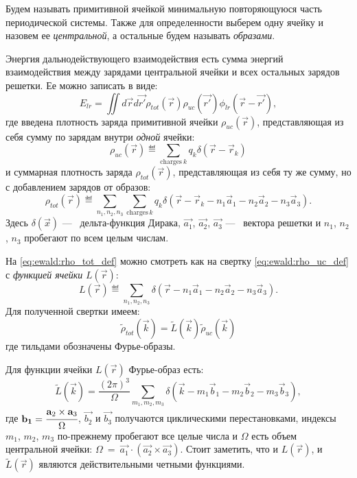 Будем называть примитивной ячейкой минимальную повторяющуюся часть периодической системы.
Также для определенности выберем одну ячейку и назовем ее \textit{центральной}, а остальные будем называть \textit{образами}.

Энергия дальнодействующего взаимодействия есть сумма энергий взаимодействия между зарядами центральной ячейки и всех остальных зарядов решетки.
Ее можно записать в виде:
\begin{equation}
    \label{eq:ewald:energy_lr}
    E_{lr}=\iint d \vec{r} d \vec{r'} \rho_{tot}(\vec{r}) \rho_{u c}\left(\vec{r'}\right) \phi_{lr}\left(\vec{r}-\vec{r'}\right),
\end{equation}
где введена плотность заряда примитивной ячейки $\rho_{uc} (\vec{r})$, представляющая из себя сумму по зарядам внутри \textit{одной} ячейки:
\begin{equation}
    \label{eq:ewald:rho_uc_def}
    \rho_{uc}(\vec{r}) \eqdef \sum_{\text{charges}\ k} q_{k} \delta\left(\vec{r}-\vec{r}_{k}\right)
\end{equation}
и суммарная плотность заряда $\rho_{tot}(\vec{r})$, представляющая из себя ту же сумму, но с добавлением зарядов от образов:
\begin{equation}
    \label{eq:ewald:rho_tot_def}
    \rho_{tot}(\vec{r}) \eqdef \sum_{n_{1}, n_{2}, n_{3}} \sum_{\text{charges}\,k} q_{k} \delta\left(\vec{r}-\vec{r}_{k}-n_{1} \vec{a}_{1}-n_{2} \vec{a}_{2}-n_{3} \vec{a}_{3}\right).
\end{equation}
Здесь $\delta (\vec{x})$ ---~ дельта-функция Дирака, $\vec{a_1}$, $\vec{a_2}$, $\vec{a_3}$ ---~ вектора решетки и $n_1$, $n_2$, $n_3$ пробегают по всем целым числам.

На \eqref{eq:ewald:rho_tot_def} можно смотреть как на свертку \eqref{eq:ewald:rho_uc_def} с \textit{функцией ячейки} $L (\vec{r})$:
\begin{equation}
    \label{eq:ewald:lattice_function_def}
    L(\vec{r}) \eqdef \sum_{n_{1}, n_{2}, n_{3}} \delta\left(\vec{r}-n_{1} \vec{a}_{1}-n_{2} \vec{a}_{2}-n_{3} \vec{a}_{3}\right).
\end{equation}
Для полученной свертки имеем:
\begin{equation}
    \label{eq:ewald:rho_tot_conv_prod}
    \tilde{\rho}_{tot}(\vec{k}) = \tilde{L}(\vec{k}) \tilde{\rho}_{u c}(\vec{k})
\end{equation}
где тильдами обозначены Фурье-образы.

Для функции ячейки $L(\vec{r})$ Фурье-образ есть:
\begin{equation}
    \label{eq:ewald:lattice_function_image}
    \tilde{L}(\vec{k})=\frac{(2 \pi)^{3}}{\Omega} \sum_{m_{1}, m_{2}, m_{3}} \delta\left(\vec{k}-m_{1} \vec{b}_{1}-m_{2} \vec{b}_{2}-m_{3} \vec{b}_{3}\right),
\end{equation}
где $\vec{b_1} = \cfrac{\vec{a}_{2} \times \vec{a}_{3}}{\Omega}$, $\vec{b_2}$ и $\vec{b_3}$ получаются циклическими перестановками, индексы $m_1$, $m_2$, $m_3$ по-прежнему пробегают все целые числа и $\Omega$ есть объем центральной ячейки: $\Omega~=~\vec{a_1} \cdot (\vec{a_2} \times \vec{a_3})$.
Стоит заметить, что и $L (\vec{r})$, и $\tilde{L} (\vec{r})$ являются действительными четными функциями.


